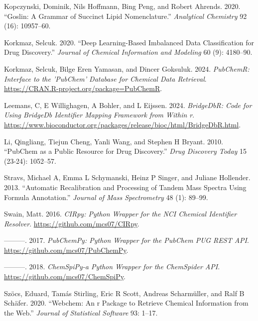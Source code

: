 \begin{CSLReferences}{1}{0}
\leavevmode{}%
Kopczynski, Dominik, Nils Hoffmann, Bing Peng, and Robert Ahrends. 2020. {``Goslin: A Grammar of Succinct Lipid Nomenclature.''} \emph{Analytical Chemistry} 92 (16): 10957--60.

\leavevmode{}%
Korkmaz, Selcuk. 2020. {``Deep Learning-Based Imbalanced Data Classification for Drug Discovery.''} \emph{Journal of Chemical Information and Modeling} 60 (9): 4180--90.

\leavevmode{}%
Korkmaz, Selcuk, Bilge Eren Yamasan, and Dincer Goksuluk. 2024. \emph{PubChemR: Interface to the 'PubChem' Database for Chemical Data Retrieval}. \url{https://CRAN.R-project.org/package=PubChemR}.

\leavevmode{}%
Leemans, C, E Willighagen, A Bohler, and L Eijssen. 2024. \emph{BridgeDbR: Code for Using BridgeDb Identifier Mapping Framework from Within r}. \url{https://www.bioconductor.org/packages/release/bioc/html/BridgeDbR.html}.

\leavevmode{}%
Li, Qingliang, Tiejun Cheng, Yanli Wang, and Stephen H Bryant. 2010. {``PubChem as a Public Resource for Drug Discovery.''} \emph{Drug Discovery Today} 15 (23-24): 1052--57.

\leavevmode{}%
Stravs, Michael A, Emma L Schymanski, Heinz P Singer, and Juliane Hollender. 2013. {``Automatic Recalibration and Processing of Tandem Mass Spectra Using Formula Annotation.''} \emph{Journal of Mass Spectrometry} 48 (1): 89--99.

\leavevmode{}%
Swain, Matt. 2016. \emph{CIRpy: Python Wrapper for the NCI Chemical Identifier Resolver}. \url{https://github.com/mcs07/CIRpy}.

\leavevmode{}%
---------. 2017. \emph{PubChemPy: Python Wrapper for the PubChem PUG REST API}. \url{https://github.com/mcs07/PubChemPy}.

\leavevmode{}%
---------. 2018. \emph{ChemSpiPy-a Python Wrapper for the ChemSpider API}. \url{https://github.com/mcs07/ChemSpiPy}.

\leavevmode{}%
Szöcs, Eduard, Tamás Stirling, Eric R Scott, Andreas Scharmüller, and Ralf B Schäfer. 2020. {``Webchem: An r Package to Retrieve Chemical Information from the Web.''} \emph{Journal of Statistical Software} 93: 1--17.


\end{CSLReferences}
